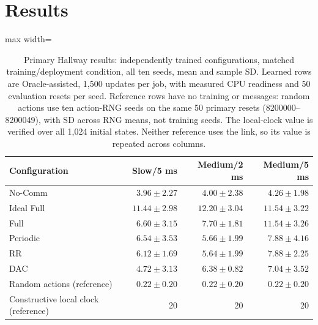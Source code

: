 \documentclass[10pt]{article}
\begin{document}
\clearpage
\vspace*{-2.5\baselineskip}\vspace*{-6pt}\vspace*{-7mm}
\section{Results}
\vspace{-6pt}
\begin{table}[!ht]\centering\setlength{\tabcolsep}{3pt}\small
\caption{Primary Hallway results: independently trained configurations, matched training/deployment condition, all ten seeds, mean and sample SD. Learned rows are Oracle-assisted, 1,500 updates per job, with measured CPU readiness and 50 evaluation resets per seed. Reference rows have no training or messages: random actions use ten action-RNG seeds on the same 50 primary resets (8200000--8200049), with SD across RNG means, not training seeds. The local-clock value is verified over all 1,024 initial states. Neither reference uses the link, so its value is repeated across columns.}\label{tab:primary}
\vspace{2.5mm}
\begin{adjustbox}{max width=\linewidth}\begin{tabular}{lrrr}\toprule
Configuration & Slow/5 ms & Medium/2 ms & Medium/5 ms\\\midrule
No-Comm & $3.96\pm2.27$ & $4.00\pm2.38$ & $4.26\pm1.98$\\
Ideal Full & $11.44\pm2.98$ & $12.20\pm3.04$ & $11.54\pm3.22$\\
Full & $6.60\pm3.15$ & $7.70\pm1.81$ & $11.54\pm3.26$\\
Periodic & $6.54\pm3.53$ & $5.66\pm1.99$ & $7.88\pm4.16$\\
RR & $6.12\pm1.69$ & $5.64\pm1.99$ & $7.88\pm2.25$\\
DAC & $4.72\pm3.13$ & $6.38\pm0.82$ & $7.04\pm3.52$\\
\midrule Random actions (reference) & $0.22\pm0.20$ & $0.22\pm0.20$ & $0.22\pm0.20$\\
Constructive local clock (reference) & 20 & 20 & 20\\
\bottomrule\end{tabular}\end{adjustbox}\end{table}
\end{document}
